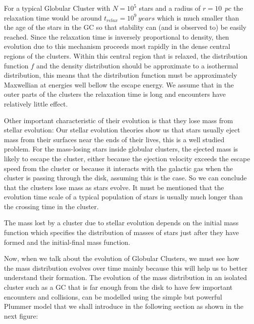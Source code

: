 For a typical Globular Cluster with $N=10^{5}$ stars and a radius of $r=10\:\:pc$ the relaxation time would be around $t_{relax}=10^{9}\:years$ which is much smaller than the age of the stars in the GC so that stability can (and is observed to) be easily reached. Since the relaxation time is inversely proportional to density, then evolution due to this mechanism proceeds most rapidly in the dense central regions of the clusters. Within this central region that is relaxed, the distribution function $f$ and the density distribution should be approximate to a isothermal distribution, this means that the distribution function must be approximately Maxwellian at energies well bellow the escape energy. We assume that in the outer parts of the clusters the relaxation time is long and encounters have relatively little effect.

Other important characteristic of their evolution is that they lose mass from stellar evolution: Our stellar evolution theories show us that stars usually eject mass from their surfaces near the ends of their lives, this is a well studied problem. For the mass-losing stars inside globular clusters, the ejected mass is likely to escape the cluster, either because the ejection velocity exceeds the escape speed from the cluster or because it interacts with the galactic gas when the cluster is passing through the disk, assuming this is the case. So we can conclude that the clusters lose mass as stars evolve. It must be mentioned that the evolution time scale of a typical population of stars is usually much longer than the crossing time in the cluster.

The mass lost by a cluster due to stellar evolution depends on the initial mass function which specifies the distribution of masses of stars just after they have formed and the initial-final mass function. 

Now, when we talk about the evolution of Globular Clusters, we must see how the mass distribution evolves over time mainly because this will help us to better understand their formation. The evolution of the mass distribution in an isolated cluster such as a GC that is far enough from the disk to have few important encounters and collisions, can be modelled using the simple but powerful Plummer model that we shall introduce in the following section as shown in the next figure:

